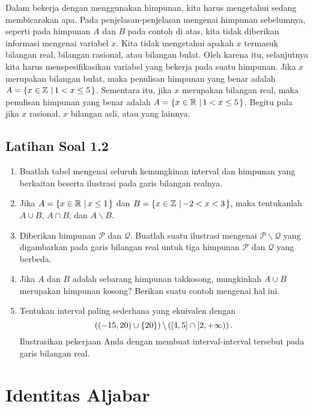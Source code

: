 \par Dalam bekerja dengan menggunakan himpunan, kita harus mengetahui sedang membicarakan apa. Pada penjelasan-penjelasan mengenai himpunan sebelumnya, seperti pada himpunan $ A $ dan $ B $ pada contoh di atas, kita tidak diberikan informasi mengenai variabel $ x $. Kita tidak mengetahui apakah $ x $ termasuk bilangan real, bilangan rasional, atau bilangan bulat. Oleh karena itu, selanjutnya kita harus menspesifikasikan variabel yang bekerja pada suatu himpunan. Jika $ x $ merupakan bilangan bulat, maka penulisan himpunan yang benar adalah $ A = \mathop{}\!\left\lbrace{{x \in \mathbb{Z}} \, \left|\, {1 < x \leq 5}\right.}\right\rbrace $. Sementara itu, jika $ x $ merupakan bilangan real, maka penulisan himpunan yang benar adalah $ A = \mathop{}\!\left\lbrace{{x \in \mathbb{R}} \, \left|\, {1 < x \leq 5}\right.}\right\rbrace $. Begitu pula jika $ x $ rasional, $ x $ bilangan asli, atau yang lainnya.

\subsection{Latihan Soal 1.2}
\begin{enumerate}[leftmargin=*]
	\item Buatlah tabel mengenai seluruh kemungkinan interval dan himpunan yang berkaitan beserta ilustrasi pada garis bilangan realnya.
	\item Jika $ A = \mathop{}\!\left\lbrace{{x \in \mathbb{R}} \, \left|\, {x \leq 1}\right.}\right\rbrace $ dan $ B = \mathop{}\!\left\lbrace{{x \in \mathbb{Z}} \, \left|\, {-2 < x < 3}\right.}\right\rbrace $, maka tentukanlah $ A \cup B $, $ A \cap B $, dan $ A \backslash B $.
	\item Diberikan himpunan $ \mathcal{P} $ dan $ \mathcal{Q} $. Buatlah suatu ilustrasi mengenai $ \mathcal{P} \backslash \mathcal{Q} $ yang digambarkan pada garis bilangan real untuk tiga himpunan $ \mathcal{P} $ dan $ \mathcal{Q} $ yang berbeda.
	\item Jika $ A $ dan $ B $ adalah sebarang himpunan takkosong, mungkinkah $ A \cup B $ merupakan himpunan kosong? Berikan suatu contoh mengenai hal ini.
	\item Tentukan interval paling sederhana yang ekuivalen dengan
	\[ \left(\left(-15, 20\right) \cup \mathop{}\!\left\lbrace20\right\rbrace\right) \backslash \left(\left[4, 5\right] \cap \mathop{}\!\left[{2, +\infty}\right)\right). \]
	Ilustrasikan pekerjaan Anda dengan membuat interval-interval tersebut pada garis bilangan real.
\end{enumerate}

\section{Identitas Aljabar}

